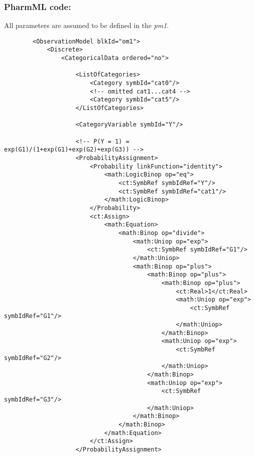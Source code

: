 \myEndLine

\subsubsection{PharmML code:}
All parameters are assumed to be defined in the  \emph{pm1}.

\lstset{language=XML}
\begin{lstlisting}
        <ObservationModel blkId="om1">
            <Discrete>
                <CategoricalData ordered="no">

                    <ListOfCategories> 
                        <Category symbId="cat0"/>
                        <!-- omitted cat1...cat4 -->
                        <Category symbId="cat5"/>
                    </ListOfCategories>
                    
                    <CategoryVariable symbId="Y"/>
                    
                    <!-- P(Y = 1) = exp(G1)/(1+exp(G1)+exp(G2)+exp(G3)) --> 
                    <ProbabilityAssignment>
                        <Probability linkFunction="identity">
                            <math:LogicBinop op="eq">
                                <ct:SymbRef symbIdRef="Y"/>
                                <ct:SymbRef symbIdRef="cat1"/>
                            </math:LogicBinop>
                        </Probability>
                        <ct:Assign>
                            <math:Equation>
                                <math:Binop op="divide">
                                    <math:Uniop op="exp">
                                        <ct:SymbRef symbIdRef="G1"/>
                                    </math:Uniop>
                                    <math:Binop op="plus">
                                        <math:Binop op="plus">
                                            <math:Binop op="plus">
                                                <ct:Real>1</ct:Real>
                                                <math:Uniop op="exp">
                                                    <ct:SymbRef symbIdRef="G1"/>
                                                </math:Uniop>
                                            </math:Binop>
                                            <math:Uniop op="exp">
                                                <ct:SymbRef symbIdRef="G2"/>
                                            </math:Uniop>
                                        </math:Binop>
                                        <math:Uniop op="exp">
                                            <ct:SymbRef symbIdRef="G3"/>
                                        </math:Uniop>
                                    </math:Binop>
                                </math:Binop>
                            </math:Equation>
                        </ct:Assign>
                    </ProbabilityAssignment>
                    

\end{lstlisting}
